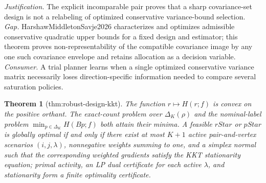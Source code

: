 \documentclass{article}
\newtheorem{theorem}{Theorem}
\begin{document}
\par\smallskip\noindent \textit{Justification.} The explicit incomparable pair proves that a sharp covariance-set design is not a relabeling of optimized conservative variance-bound selection. \textit{Gap.} HarshawMiddletonSavje2026 characterizes and optimizes admissible conservative quadratic upper bounds for a fixed design and estimator; this theorem proves non-representability of the compatible covariance image by any one such covariance envelope and retains allocation as a decision variable. \textit{Consumer.} A trial planner learns when a single optimized conservative variance matrix necessarily loses direction-specific information needed to compare several saturation policies.

\begin{theorem}[thm:robust-design-kkt]\label{thm:robust-design-kkt}
The function \(r\mapsto H(r;f)\) is convex on the positive orthant. The exact-count problem over \(\Delta_K(\rho)\) and the nominal-label problem \(\min_{p\in\Delta_K}H(Bp;f)\) both attain their minima. A feasible \(rStar\) or \(pStar\) is globally optimal if and only if there exist at most \(K+1\) active pair-and-vertex scenarios \((i,j,\lambda)\), nonnegative weights summing to one, and a simplex normal such that the corresponding weighted gradients satisfy the KKT stationarity equation; primal activity, an LP dual certificate for each active \(\lambda\), and stationarity form a finite optimality certificate.
\end{theorem}
\end{document}

